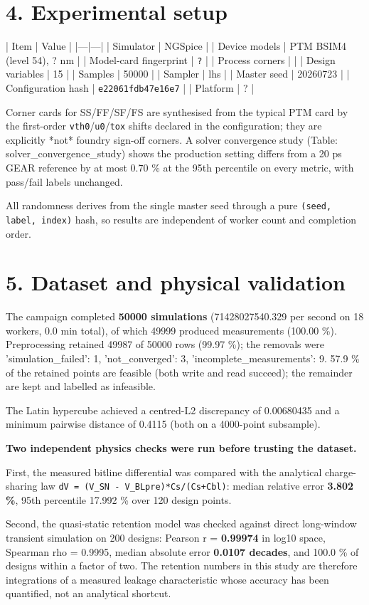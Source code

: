 \documentclass[conference]{IEEEtran}
\begin{document}
\section{4. Experimental setup}
| Item | Value |
|---|---|
| Simulator | NGSpice |
| Device models | PTM BSIM4 (level 54), ? nm  |
| Model-card fingerprint | \texttt{?} |
| Process corners |  |
| Design variables | 15 |
| Samples | 50000 |
| Sampler | lhs |
| Master seed | 20260723 |
| Configuration hash | \texttt{e22061fdb47e16e7} |
| Platform | ? |

Corner cards for SS/FF/SF/FS are synthesised from the typical PTM card by the
first-order \texttt{vth0}/\texttt{u0}/\texttt{tox} shifts declared in the configuration; they are
explicitly *not* foundry sign-off corners. A solver convergence study (Table: solver\_convergence\_study) shows the production setting differs from a 20 ps GEAR reference by at most 0.70 \% at the 95th percentile on every metric, with pass/fail labels unchanged.

All randomness derives from the single master seed through a pure
\texttt{(seed, label, index)} hash, so results are independent of worker count and
completion order.

\section{5. Dataset and physical validation}
The campaign completed \textbf{50000 simulations}
(71428027540.329 per second on
18 workers, 0.0 min
total), of which 49999 produced measurements
(100.00 \%). Preprocessing retained
49987 of 50000 rows
(99.97 \%); the removals were
{'simulation\_failed': 1, 'not\_converged': 3, 'incomplete\_measurements': 9}. 57.9 \% of the retained points are feasible (both write and read succeed); the remainder are kept and labelled as infeasible.

The Latin hypercube achieved a centred-L2 discrepancy of
0.00680435 and a minimum pairwise
distance of 0.4115
(both on a 4000-point subsample).

\textbf{Two independent physics checks were run before trusting the dataset.}

First, the measured bitline differential was compared with the analytical charge-sharing law \texttt{dV = (V\_SN - V\_BLpre)*Cs/(Cs+Cbl)}: median relative error \textbf{3.802 \%}, 95th percentile 17.992 \% over 120 design points.

Second, the quasi-static retention model was checked against direct long-window transient simulation on 200 designs: Pearson r = \textbf{0.99974} in log10 space, Spearman rho = 0.9995, median absolute error \textbf{0.0107 decades}, and 100.0 \% of designs within a factor of two. The retention numbers in this study are therefore integrations of a measured leakage characteristic whose accuracy has been quantified, not an analytical shortcut.
\end{document}
